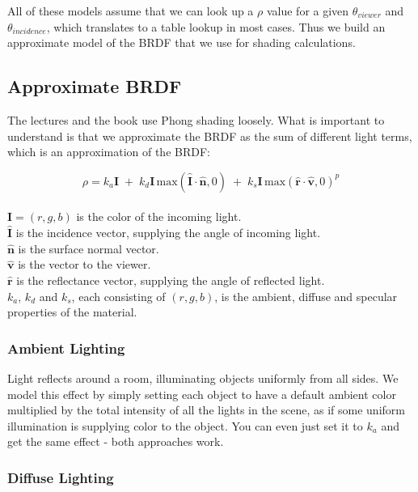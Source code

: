\documentclass[]{article}
\begin{document}
All of these models assume that we can look up a $\rho$ value for a given $\theta_{viewer}$ and $\theta_{incidence}$, which translates to a table lookup in most cases. Thus we build an approximate model of the BRDF that we use for shading calculations.

\pagebreak

\subsection{Approximate BRDF}

The lectures and the book use Phong shading loosely. What is important to understand is that we approximate the BRDF as the sum of different light terms, which is an approximation of the BRDF:

\begin{equation}
    \rho = k_{a}\mathbf{I} \; + \; k_{d}\mathbf{I}\,\text{max}(\hat{\mathbf{I}} \cdot \hat{\mathbf{n}}, 0) \; + \; k_{s}\mathbf{I}\,\text{max}(\hat{\mathbf{r}} \cdot \hat{\mathbf{v}}, 0)^{p}
\end{equation}
\\
$\mathbf{I} = (r,g,b)$ is the color of the incoming light.\\
$\mathbf{\hat{I}}$ is the incidence vector, supplying the angle of incoming light.\\
$\mathbf{\hat{n}}$ is the surface normal vector.\\
$\mathbf{\hat{v}}$ is the vector to the viewer.\\
$\mathbf{\hat{r}}$ is the reflectance vector, supplying the angle of reflected light.\\
$k_{a}$, $k_{d}$ and $k_{s}$, each consisting of $(r,g,b)$, is the ambient, diffuse and specular properties of the material. 

\subsubsection{Ambient Lighting}

Light reflects around a room, illuminating objects uniformly from all sides. We model this effect by simply setting each object to have a default ambient color multiplied by the total intensity of all the lights in the scene, as if some uniform illumination is supplying color to the object. You can even just set it to $k_{a}$ and get the same effect - both approaches work.

\subsubsection{Diffuse Lighting}
\end{document}
